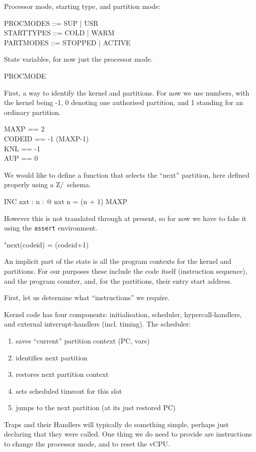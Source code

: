 Processor mode, starting type, and partition mode:
\begin{circus}
   PROCMODES ::= SUP | USR
\\ STARTTYPES ::= COLD | WARM
\\ PARTMODES ::= STOPPED | ACTIVE
\end{circus}

State variables, for now just the processor mode.
\begin{circus}
PROCMODE 
\end{circus}

First, a way to identify the kernel and partitions.
For now we use numbers, with the kernel being -1,
0 denoting one authorised partition,
and 1 standing for an ordinary partition.
\begin{circus}
   MAXP   == 2
\\ CODEID == -1 \upto (MAXP-1)
\\ KNL    == -1
\\ AUP    == 0
\end{circus}

We would like to define a function that selects the ``next'' partition,
here defined properly using a Z/\Circus\ schema.
\begin{schema}{INC}
  nxt : \nat \fun \nat
\where
  \forall n : \nat @ nxt n = (n + 1) \mod MAXP
\end{schema}
However this is not translated through at present,
so for now we have to fake it using the \texttt{assert} environment.
\begin{assert}
"next(codeid) = (codeid+1) %
\end{assert}

An implicit part of the state is all the program
contexts for the kernel and partitions.
For our purposes these include the code itself (instruction sequence),
and the program counter, and, for the partitions,
their entry start address.

First, let us determine what ``instructions'' we require.

Kernel code has four components:
initialisation, scheduler, hypercall-handlers,
and external interrupt-handlers (incl. timing).
The scheduler:
\begin{enumerate}
  \item saves ``current'' partition context (PC, vars)
  \item identifies next partition
  \item restores next partition context
  \item sets scheduled timeout for this slot
  \item jumps to the next partition (at its just restored PC)
\end{enumerate}
Traps and their Handlers will typically do something simple,
perhaps just declaring that they were called.
One thing we do need to provide are instructions
to change the processor mode, and to reset the vCPU.

